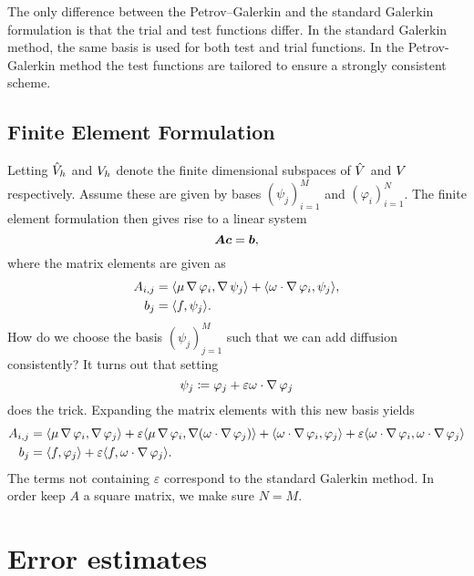 The only difference between the Petrov--Galerkin and the standard Galerkin
formulation is that the trial and test functions differ. In the standard
Galerkin method, the same basis is used for both test and trial functions.  In
the Petrov-Galerkin method the test functions are tailored to ensure a
strongly consistent scheme.

\subsection{Finite Element Formulation}
\label{sub:finite_element_formulation_diffusion}

Letting \( \hat{V}_h\) and \(V_h\) denote the finite dimensional subspaces
of \( \hat{V} \) and \( V \) respectively. Assume these are given by bases
\( (\psi_j)_{i=1}^M \) and \( (\varphi_i)_{i=1}^N \).  The finite element
formulation then gives rise to a linear system
\begin{equation}
    \boldsymbol{A} \boldsymbol{c} = \boldsymbol{b},
\end{equation}
where the matrix elements are given as
\begin{align}
    A_{i, j} &= \langle \mu \operatorname{\mathop{}\!\nabla} \varphi_i , \operatorname{\mathop{}\!\nabla} \psi_j \rangle + \langle \omega \cdot \operatorname{\mathop{}\!\nabla} \varphi_i, \psi_j \rangle, \\
    b_j &= \langle f, \psi_j \rangle.
\end{align}
How do we choose the basis \( (\psi_j)_{j=1}^M \) such that we can add
diffusion consistently? It turns out that setting
\begin{equation}
    \psi_j \coloneqq \varphi_j + \varepsilon\omega \cdot \operatorname{\mathop{}\!\nabla} \varphi_j
\end{equation}
does the trick. Expanding the matrix elements with this new basis yields
\begin{align}
    A_{i, j} &= \langle \mu \grad \varphi_i , \grad\varphi_j \rangle
    + \varepsilon\langle \mu \grad \varphi_i, \grad (\omega\cdot\grad\varphi_j)\rangle
    + \langle \omega \cdot \grad \varphi_i, \varphi_j \rangle
    + \varepsilon\langle \omega \cdot \grad \varphi_i,  \omega \cdot \grad \varphi_j\rangle\\
    b_j &= \langle f, \varphi_j \rangle + \varepsilon\langle f,  \omega \cdot \grad \varphi_j \rangle.
\end{align}
The terms not containing \( \varepsilon \) correspond to the standard Galerkin
method. In order keep \(A \)  a square matrix, we make sure \( N = M \).



\section{Error estimates}
\label{sub:chp_2_error_estimates}

